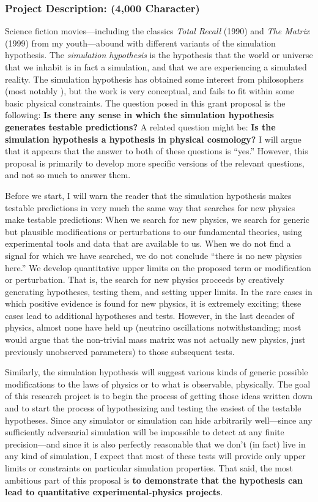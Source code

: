 \documentclass[12pt]{article}
\begin{document}
\subsubsection*{Project Description: (4,000 Character)}
Science fiction movies---including the classics \textit{Total Recall} (1990) and \textit{The Matrix} (1999) from my youth---abound with different variants of the simulation hypothesis.
The \emph{simulation hypothesis} is the hypothesis that the world or universe that we inhabit is in fact a simulation, and that we are experiencing a simulated reality.
The simulation hypothesis has obtained some interest from philosophers (most notably \cite{bostrom}), but the work is very conceptual, and fails to fit within some basic physical constraints.
The question posed in this grant proposal is the following:
\textbf{Is there any sense in which the simulation hypothesis generates testable predictions?}
A related question might be:
\textbf{Is the simulation hypothesis a hypothesis in physical cosmology?}
I will argue that it appears that the answer to both of these questions is ``yes.''
However, this proposal is primarily to develop more specific versions of the relevant questions, and not so much to answer them.

Before we start, I will warn the reader that the simulation hypothesis makes testable predictions in very much the same way that searches for new physics make testable predictions:
When we search for new physics, we search for generic but plausible modifications or perturbations to our fundamental theories,
using experimental tools and data that are available to us.
When we do not find a signal for which we have searched, we do not conclude ``there is no new physics here.''
We develop quantitative upper limits on the proposed term or modification or perturbation.
That is, the search for new physics proceeds by creatively generating hypotheses, testing them, and setting upper limits.
In the rare cases in which positive evidence is found for new physics, it is extremely exciting; these cases lead to additional hypotheses and tests.
However, in the last decades of physics, almost none have held up (neutrino oscillations notwithstanding; most would argue that the non-trivial mass matrix was not actually new physics, just previously unobserved parameters) to those subsequent tests.

Similarly, the simulation hypothesis will suggest various kinds of generic possible modifications to the laws of physics or to what is observable, physically.
The goal of this research project is to begin the process of getting those ideas written down and to start the process of hypothesizing and testing the easiest of the testable hypotheses.
Since any simulator or simulation can hide arbitrarily well---since any sufficiently adversarial simulation will be impossible to detect at any finite precision---and since it is also perfectly reasonable that we don't (in fact) live in any kind of  simulation, I expect that most of these tests will provide only upper limits or constraints on particular simulation properties.
That said, the most ambitious part of this proposal is \textbf{to demonstrate that the hypothesis can lead to quantitative experimental-physics projects}.
\end{document}
